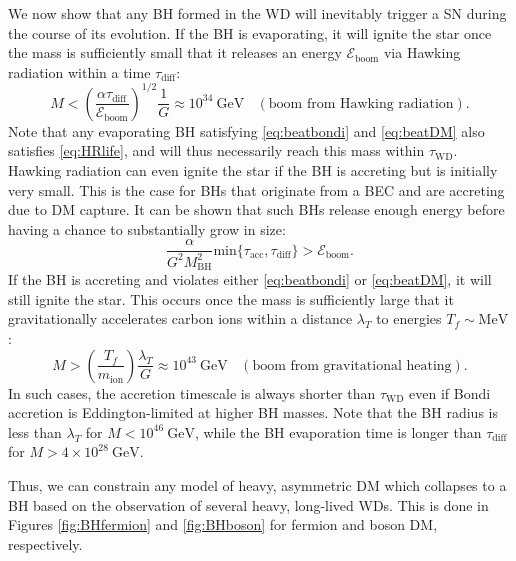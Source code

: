 \documentclass[preprintnumbers,amsmath,amssymb,prd,superscriptaddress]{revtex4}
\newcommand{\Eboom}{\mathcal{E}_\text{boom}}
\newcommand{\GeV}{\text{GeV}}
\newcommand{\MeV}{\text{MeV}}
\def\r{\right)}
\def\l{\left(}
\begin{document}
We now show that any BH formed in the WD will inevitably trigger a SN during the course of its evolution. 
If the BH is evaporating, it will ignite the star once the mass is sufficiently small that it releases an energy $\Eboom$ via Hawking radiation within a time $\tau_\text{diff}$:
\begin{equation}
M < \l \frac{\alpha \tau_\text{diff}}{\Eboom}\r^{1/2} \frac{1}{G} \approx 10^{34} ~\GeV ~~~~ (\text{boom from Hawking radiation}).
\end{equation}
Note that any evaporating BH satisfying \eqref{eq:beatbondi} and \eqref{eq:beatDM} also satisfies \eqref{eq:HRlife}, and will thus necessarily reach this mass within $\tau_\text{WD}$. 
Hawking radiation can even ignite the star if the BH is accreting but is initially very small. 
This is the case for BHs that originate from a BEC and are accreting due to DM capture.
It can be shown that such BHs release enough energy before having a chance to substantially grow in size:
\begin{equation}
\frac{\alpha}{G^2 M_\text{BH}^2} \text{min}\{\tau_\text{acc},\tau_\text{diff}\} > \Eboom.
\end{equation}
If the BH is accreting and violates either \eqref{eq:beatbondi} or \eqref{eq:beatDM}, it will still ignite the star. 
This occurs once the mass is sufficiently large that it gravitationally accelerates carbon ions within a distance $\lambda_T$ to energies $T_f \sim \MeV$:
\begin{equation}
M > \l \frac{T_f}{m_\text{ion}} \r \frac{\lambda_T}{G} \approx 10^{43} ~\GeV ~~~~ (\text{boom from gravitational heating}). 
\end{equation}
In such cases, the accretion timescale is always shorter than $\tau_\text{WD}$ even if Bondi accretion is Eddington-limited at higher BH masses. 
Note that the BH radius is less than $\lambda_T$ for $M < 10^{46} ~\GeV$, while the BH evaporation time is longer than $\tau_\text{diff}$ for $M > 4 \times 10^{28} ~\GeV$.

Thus, we can constrain any model of heavy, asymmetric DM which collapses to a BH based on the observation of several heavy, long-lived WDs. 
This is done in Figures \ref{fig:BHfermion} and \ref{fig:BHboson} for fermion and boson DM, respectively. 
\end{document}
